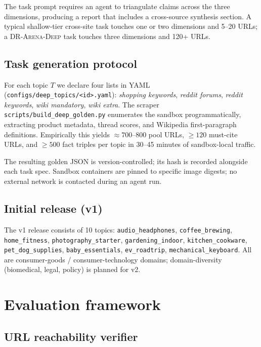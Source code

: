 \documentclass[11pt]{article}
\begin{document}
The task prompt requires an agent to triangulate claims across the three
dimensions, producing a report that includes a cross-source synthesis
section. A typical shallow-tier cross-site task touches one or two
dimensions and 5--20 URLs; a \textsc{DR-Arena-Deep} task touches three
dimensions and 120+ URLs.

\subsection{Task generation protocol}

For each topic $T$ we declare four lists in YAML
(\texttt{configs/deep\_topics/<id>.yaml}): \emph{shopping keywords},
\emph{reddit forums}, \emph{reddit keywords}, \emph{wiki mandatory},
\emph{wiki extra}. The scraper \texttt{scripts/build\_deep\_golden.py}
enumerates the sandbox programmatically, extracting product metadata,
thread scores, and Wikipedia first-paragraph definitions. Empirically
this yields $\approx 700$--$800$ pool URLs, $\geq 120$ must-cite URLs,
and $\geq 500$ fact triples per topic in 30--45 minutes of sandbox-local
traffic.

The resulting golden JSON is version-controlled; its hash is recorded
alongside each task spec. Sandbox containers are pinned to specific
image digests; no external network is contacted during an agent run.

\subsection{Initial release (v1)}

The v1 release consists of 10 topics:
\texttt{audio\_headphones},
\texttt{coffee\_brewing},
\texttt{home\_fitness},
\texttt{photography\_starter},
\texttt{gardening\_indoor},
\texttt{kitchen\_cookware},
\texttt{pet\_dog\_supplies},
\texttt{baby\_essentials},
\texttt{ev\_roadtrip},
\texttt{mechanical\_keyboard}.
All are consumer-goods / consumer-technology domains; domain-diversity
(biomedical, legal, policy) is planned for v2.

\section{Evaluation framework}
\label{sec:eval}

\subsection{URL reachability verifier}
\label{sec:reach}
\end{document}
